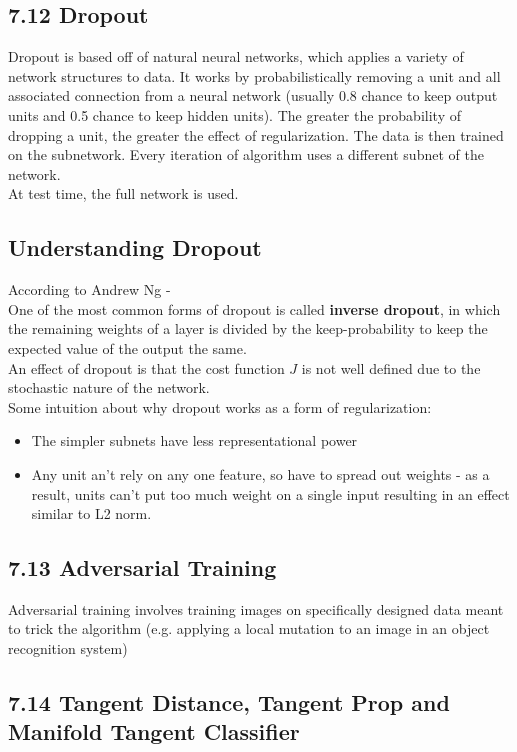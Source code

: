\documentclass[a4paper]{report}
\begin{document}
\subsection{7.12 Dropout}
Dropout is based off of natural neural networks, which applies a variety of network structures to data. It works by probabilistically removing a unit and all associated connection from a neural network (usually 0.8 chance to keep output units and 0.5 chance to keep hidden units). The greater the probability of dropping a unit, the greater the effect of regularization. The data is then trained on the subnetwork. Every iteration of algorithm uses a different subnet of the network.\\
At test time, the full network is used.\\
\subsection{Understanding Dropout}
According to Andrew Ng -\\
One of the most common forms of dropout is called \textbf{inverse dropout}, in which the remaining weights of a layer is divided by the keep-probability to keep the expected value of the output the same.\\
An effect of dropout is that the cost function $J$ is not well defined due to the stochastic nature of the network.\\
Some intuition about why dropout works as a form of regularization:
\begin{itemize}
    \item The simpler subnets have less representational power
    \item Any unit an't rely on any one feature, so have to spread out weights - as a result, units can't put too much weight on a single input resulting in an effect similar to L2 norm.
\end{itemize}

\subsection{7.13 Adversarial Training}
Adversarial training involves training images on specifically designed data meant to trick the algorithm (e.g. applying a local mutation to an image in an object recognition system)

\subsection{7.14 Tangent Distance, Tangent Prop and Manifold Tangent Classifier}
\end{document}
